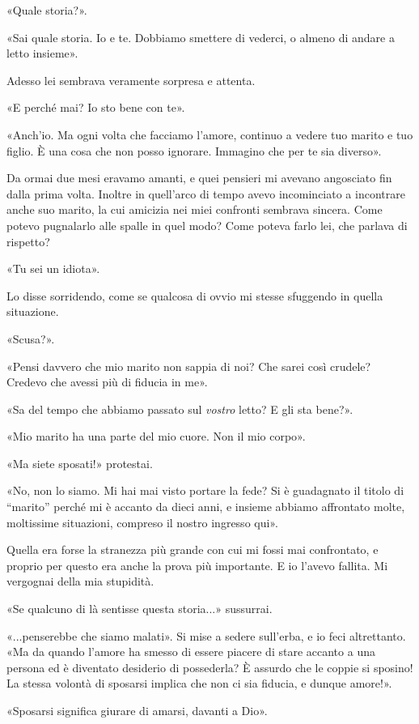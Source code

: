 \documentclass[a4paper,12pt]{book}
\begin{document}
«Quale storia?».

«Sai quale storia. Io e te. Dobbiamo smettere di vederci, o almeno di andare a
letto insieme».

Adesso lei sembrava veramente sorpresa e attenta.

«E perché mai? Io sto bene con te».

«Anch'io. Ma ogni volta che facciamo l'amore, continuo a vedere tuo marito e tuo
figlio. È una cosa che non posso ignorare. Immagino che per te sia diverso».

Da ormai due mesi eravamo amanti, e quei pensieri mi avevano angosciato fin dalla
prima volta. Inoltre in quell'arco di tempo avevo incominciato a incontrare anche
suo marito, la cui amicizia nei miei confronti sembrava sincera. Come potevo
pugnalarlo alle spalle in quel modo? Come poteva farlo lei, che parlava di
rispetto?

«Tu sei un idiota».

Lo disse sorridendo, come se qualcosa di ovvio mi stesse sfuggendo in quella
situazione.

«Scusa?».

«Pensi davvero che mio marito non sappia di noi? Che sarei così crudele? Credevo
che avessi più di fiducia in me».

«Sa del tempo che abbiamo passato sul \emph{vostro} letto? E gli sta bene?».

«Mio marito ha una parte del mio cuore. Non il mio corpo».

«Ma siete sposati!» protestai.

«No, non lo siamo. Mi hai mai visto portare la fede? Si è guadagnato il titolo
di ``marito'' perché mi è accanto da dieci anni, e insieme abbiamo affrontato
molte, moltissime situazioni, compreso il nostro ingresso qui».

Quella era forse la stranezza più grande con cui mi fossi mai confrontato, e
proprio per questo era anche la prova più importante. E io l'avevo fallita. Mi
vergognai della mia stupidità.

«Se qualcuno di là sentisse questa storia...» sussurrai.

«...penserebbe che siamo malati». Si mise a sedere sull'erba, e io feci
altrettanto. «Ma da quando l'amore ha smesso di essere piacere di stare accanto a
una persona ed è diventato desiderio di possederla? È assurdo che le coppie si
sposino! La stessa volontà di sposarsi implica che non ci sia fiducia, e dunque
amore!».

«Sposarsi significa giurare di amarsi, davanti a Dio».
\end{document}
